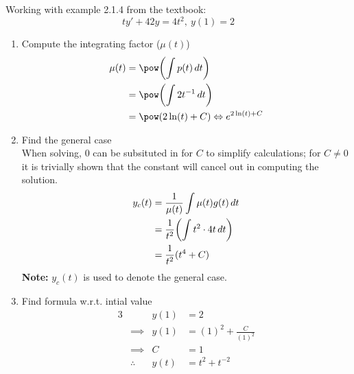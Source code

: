 \documentclass[twoside]{report}
\begin{document}
    \begin{example}
        Working with example 2.1.4 from the textbook:
        \begin{equation}
            ty' +4 2y = 4 t^{2},\ y(1) = 2
        \end{equation}
        \begin{enumerate}
            \item Compute the integrating factor ($\mu(t)$)
                \begin{align}
                    \mu(t) &= \pow\bbbp{\int p(t)\,dt}\\
                    &= \pow\bbbp{\int 2 t^{-1}\,dt}\\
                    &= \pow\bp{2\ln(t) + C} \Leftrightarrow e^{2\ln(t) + C}
                \end{align}
            \item Find the general case\\
                When solving, $0$ can be subsituted in for $C$ to simplify calculations; for $C \neq 0$ it is trivially shown that the constant will cancel out in computing the solution.
                \begin{align}
                    y_c(t) &= \frac{1}{\mu(t)}\int \mu(t)g(t)\,dt\\
                    &= \frac{1}{t^{2}}\bbbp{\int t^{2}\cdot 4t\,dt}\\
                    &= \frac{1}{t^{2}}(t^{4} + C)
                \end{align}
                \textbf{Note:} $y_c(t)$ is used to denote the general case.
            \item Find formula w.r.t. intial value
                \begin{alignat}{3}
                    &&y(1) &= 2\\
                    &\implies &y(1) &= (1)^{2} + \frac{C}{(1)^{2}}\\
                    &\implies &C &= 1\\
                    &\therefore &y(t) &= t^{2} + t^{-2}
                \end{alignat}
        \end{enumerate}
    \end{example}
\end{document}
